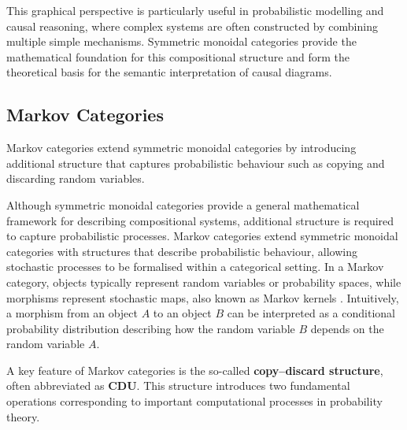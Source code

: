 \documentclass[a4paper]{report}
\begin{document}
This graphical perspective is particularly useful in probabilistic modelling and causal reasoning, where complex systems are often constructed by combining multiple simple mechanisms. Symmetric monoidal categories provide the mathematical foundation for this compositional structure and form the theoretical basis for the semantic interpretation of causal diagrams.

\subsection{Markov Categories}

Markov categories\cite{FRITZ2020107239} extend symmetric monoidal categories by introducing additional structure that captures probabilistic behaviour such as copying and discarding random variables.

Although symmetric monoidal categories provide a general mathematical framework for describing compositional systems, additional structure is required to capture probabilistic processes. Markov categories extend symmetric monoidal categories with structures that describe probabilistic behaviour, allowing stochastic processes to be formalised within a categorical setting. 
In a Markov category, objects typically represent random variables or probability spaces, while morphisms represent stochastic maps, also known as Markov kernels \cite{markov-kernel-cat}. Intuitively, a morphism from an object $A$ to an object $B$ can be interpreted as a conditional probability distribution describing how the random variable $B$ depends on the random variable $A$.

A key feature of Markov categories is the so-called \textbf{copy–discard structure}, often abbreviated as \textbf{CDU}\cite{stoch-cdu}. This structure introduces two fundamental operations corresponding to important computational processes in probability theory.
\end{document}
